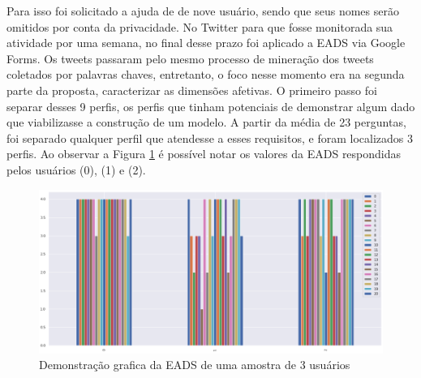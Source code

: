 Para isso foi solicitado a ajuda de  de nove usuário, sendo que seus nomes serão omitidos por conta da privacidade. No Twitter para que fosse monitorada sua atividade por uma semana, no final desse prazo foi aplicado a EADS via Google Forms. Os tweets passaram pelo mesmo processo de mineração dos tweets coletados por palavras chaves, entretanto, o foco nesse momento era na segunda parte da proposta, caracterizar as dimensões afetivas. O primeiro passo foi separar desses 9 perfis, os perfis que tinham potenciais de demonstrar algum dado que viabilizasse a construção de um modelo. A partir da média de 23 perguntas, foi separado qualquer perfil que atendesse a esses requisitos, e foram localizados 3 perfis. Ao observar a Figura \ref{fig:ueadsr} é possível notar os valores da EADS respondidas pelos usuários (0), (1) e (2).

\begin{figure}[!ht]
    \centering
    \includegraphics[width=1\textwidth]{imagens/ueadsr.png}
    \caption{Demonstração grafica da EADS de uma amostra de 3 usuários}
    \label{fig:ueadsr}
\end{figure}

